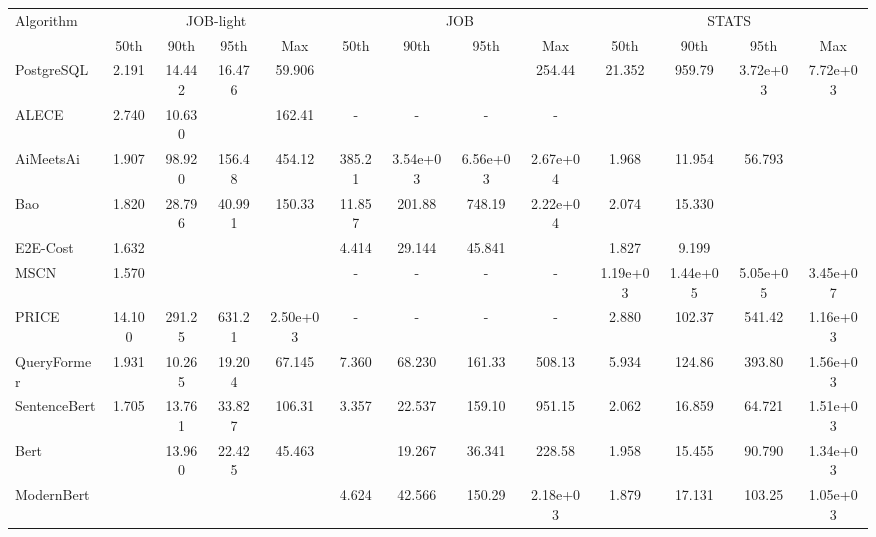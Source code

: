 \begin{tabular}{l|cccc|cccc|cccc}

\toprule

\multirow{2}{*}{Algorithm} & \multicolumn{4}{c|}{JOB-light} & \multicolumn{4}{c|}{JOB} & \multicolumn{4}{c|}{STATS} \\

 & 50th & 90th & 95th & Max & 50th & 90th & 95th & Max & 50th & 90th & 95th & Max \\

\midrule

PostgreSQL & 2.191 & 14.442 & 16.476 & 59.906 & \cellcolor{green3}{2.756} & \cellcolor{green4}{13.080} & \cellcolor{green4}{22.475} & 254.44 & 21.352 & 959.79 & 3.72e+03 & 7.72e+03 \\
ALECE & 2.740 & 10.630 & \cellcolor{green2}{12.560} & 162.41 & - & - & - & - & \cellcolor{green5}{1.470} & \cellcolor{green5}{3.760} & \cellcolor{green5}{5.030} & \cellcolor{green5}{37.670} \\
AiMeetsAi & 1.907 & 98.920 & 156.48 & 454.12 & 385.21 & 3.54e+03 & 6.56e+03 & 2.67e+04 & 1.968 & 11.954 & 56.793 & \cellcolor{green2}{410.76} \\
Bao & 1.820 & 28.796 & 40.991 & 150.33 & 11.857 & 201.88 & 748.19 & 2.22e+04 & 2.074 & 15.330 & \cellcolor{green1}{38.137} & \cellcolor{green4}{255.89} \\
E2E-Cost & 1.632 & \cellcolor{green1}{9.376} & \cellcolor{green4}{11.549} & \cellcolor{green3}{30.175} & 4.414 & 29.144 & 45.841 & \cellcolor{green3}{130.52} & 1.827 & 9.199 & \cellcolor{green4}{20.815} & \cellcolor{green3}{345.18} \\
MSCN & 1.570 & \cellcolor{green3}{8.710} & \cellcolor{green5}{11.400} & \cellcolor{green2}{33.040} & - & - & - & - & 1.19e+03 & 1.44e+05 & 5.05e+05 & 3.45e+07 \\
PRICE & 14.100 & 291.25 & 631.21 & 2.50e+03 & - & - & - & - & 2.880 & 102.37 & 541.42 & 1.16e+03 \\
QueryFormer & 1.931 & 10.265 & 19.204 & 67.145 & 7.360 & 68.230 & 161.33 & 508.13 & 5.934 & 124.86 & 393.80 & 1.56e+03 \\
\midrule

SentenceBert & 1.705 & 13.761 & 33.827 & 106.31 & 3.357 & 22.537 & 159.10 & 951.15 & 2.062 & 16.859 & 64.721 & 1.51e+03 \\
Bert & \cellcolor{green3}{1.467} & 13.960 & 22.425 & 45.463 & \cellcolor{green4}{2.746} & 19.267 & 36.341 & 228.58 & 1.958 & 15.455 & 90.790 & 1.34e+03 \\
ModernBert & \cellcolor{green4}{1.453} & \cellcolor{green2}{9.127} & \cellcolor{green3}{12.291} & \cellcolor{green5}{24.537} & 4.624 & 42.566 & 150.29 & 2.18e+03 & 1.879 & 17.131 & 103.25 & 1.05e+03 \\
\midrule


\end{tabular}
